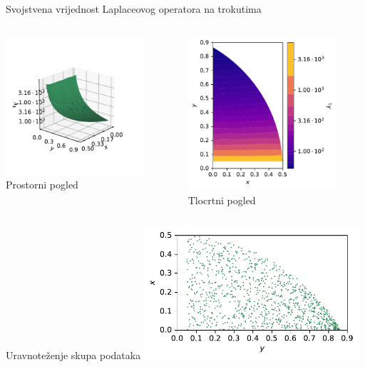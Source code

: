\documentclass[croatian, 12pt, usepdftitle = false, xcolor = {{usenames, dvipsnames, svgnames, x11names}}, hyperref = {unicode}]{beamer}
\begin{document}
    \begin{frame}{Svojstvena vrijednost Laplaceovog operatora na trokutima}
        \centering
        \begin{columns}
            \begin{column}{0.5\textwidth}
                \centering
                \includegraphics[width = 51.6mm]{figures/eigenvalues_3D.pdf}
                \\
                Prostorni pogled
            \end{column}
            \begin{column}{0.5\textwidth}
                \centering
                \includegraphics[width = 55.2mm]{figures/eigenvalues.pdf}
                \\
                Tlocrtni pogled
            \end{column}
        \end{columns}
    \end{frame}

    \begin{frame}{Uravnoteženje skupa podataka}
        \centering
        \includegraphics[width = 80mm]{figures/sample.pdf}
    \end{frame}
\end{document}
